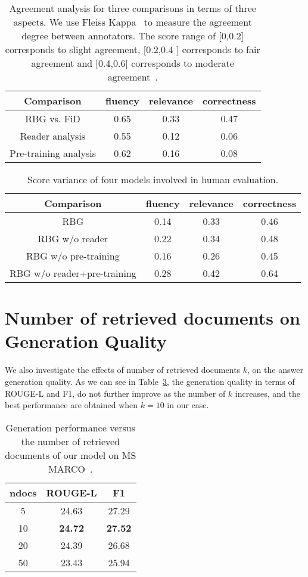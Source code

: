 \documentclass[11pt]{article}
\begin{document}
\begin{table}[!ht]
\centering
\resizebox{0.45\textwidth}{!}
{
\begin{tabular}{c|ccc}
\hline
Comparison    & fluency & relevance & correctness  \\ \hline
RBG vs. FiD  &    0.65 &    0.33 &    0.47 \\
Reader analysis  & 0.55 &    0.12 &    0.06  \\
Pre-training analysis&  0.62 &    0.16 &    0.08 \\ \hline
\end{tabular}
}
\caption{Agreement analysis for three comparisons in terms of three aspects. We use Fleiss Kappa~\cite{fleiss_kappa} to measure the agreement degree between annotators. The score range of [0,0.2] corresponds to slight agreement, [0.2,0.4 ] corresponds to fair agreement and [0.4,0.6] corresponds to moderate agreement~\cite{landis1977measurement}.}
\label{tab:agreement}
\end{table}

\begin{table}[!ht]
\centering
\resizebox{0.45\textwidth}{!}
{
\begin{tabular}{c|ccc}
\hline
Comparison    & fluency & relevance & correctness  \\ \hline
RBG  &    0.14 &    0.33 &    0.46 \\
RBG w/o reader & 0.22 &    0.34 &    0.48 \\
RBG w/o pre-training &  0.16 &    0.26 &    0.45 \\ 
RBG w/o reader+pre-training &  0.28 &    0.42 &    0.64 \\ \hline
\end{tabular}
}
\caption{Score variance of four models involved in human evaluation. }
\label{tab:variance}
\end{table}

\section{Number of retrieved documents on Generation Quality}

We also investigate the effects of number of retrieved documents $k$, on the answer generation quality. As we can see in Table~\ref{tab:results_k}, the generation quality in terms of ROUGE-L and F1, do not further improve as the number of $k$ increases, and the best performance are obtained when $k=10$ in our case.

\begin{table}[]\small
\centering
\begin{tabular}{c|cc}
\hline
ndocs & ROUGE-L & F1    \\ \hline
5     & 24.63   & 27.29 \\
10    & \textbf{24.72}   & \textbf{27.52} \\
20    & 24.39   & 26.68 \\
50    & 23.43   & 25.94 \\ \hline
\end{tabular}
\caption{Generation performance versus the number of retrieved documents of our model on MS MARCO~\cite{nguyen2016ms}.}
\label{tab:results_k}
\end{table}
\end{document}
